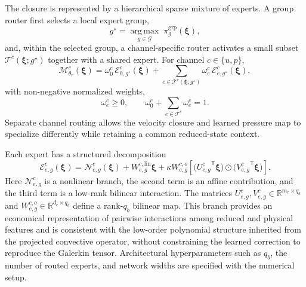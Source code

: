 The closure is represented by a hierarchical sparse mixture of experts.  A
group router first selects a local expert group,
\begin{equation}
  g^{\star}
  =
  \underset{g\in\mathcal{G}}{\operatorname{arg\,max}}
  \;\pi_g^{\mathrm{grp}}(\boldsymbol{\xi}),
  \label{eq:group_top1}
\end{equation}
and, within the selected group, a channel-specific router activates a small
subset $\mathcal{T}^{c}(\boldsymbol{\xi};g^{\star})$ together with a shared
expert.  For channel $c\in\{u,p\}$,
\begin{equation}
  \boldsymbol{\mathcal{M}}^{c}_{\theta_r}(\boldsymbol{\xi})
  =
  \omega^{c}_{0}\,
  \mathcal{E}^{c}_{0,g^{\star}}(\boldsymbol{\xi})
  +
  \sum_{e\in\mathcal{T}^{c}(\boldsymbol{\xi};g^{\star})}
  \omega^{c}_{e}\,
  \mathcal{E}^{c}_{e,g^{\star}}(\boldsymbol{\xi}),
  \label{eq:channel_sparse_moe}
\end{equation}
with non-negative normalized weights,
\begin{equation}
  \omega^{c}_{e}\ge 0,
  \qquad
  \omega^{c}_{0}
  +\sum_{e\in\mathcal{T}^{c}}\omega^{c}_{e}=1.
  \label{eq:channel_sparse_weights}
\end{equation}
Separate channel routing allows the velocity closure and learned pressure map
to specialize differently while retaining a common reduced-state context.

Each expert has a structured decomposition
\begin{equation}
  \mathcal{E}^{c}_{e,g}(\boldsymbol{\xi})
  =
  \mathcal{N}^{c}_{e,g}(\boldsymbol{\xi})
  +W^{c,\mathrm{lin}}_{e,g}\boldsymbol{\xi}
  +\kappa W^{c,o}_{e,g}
  \left[
    \bigl({U^{c}_{e,g}}^{\mathsf T}\boldsymbol{\xi}\bigr)
    \odot
    \bigl({V^{c}_{e,g}}^{\mathsf T}\boldsymbol{\xi}\bigr)
  \right].
  \label{eq:physics_aware_expert}
\end{equation}
Here $\mathcal{N}^{c}_{e,g}$ is a nonlinear branch, the second term is an
affine contribution, and the third term is a low-rank bilinear interaction.
The matrices $U^{c}_{e,g},V^{c}_{e,g}\in\mathbb{R}^{m_r\times q_b}$ and
$W^{c,o}_{e,g}\in\mathbb{R}^{d_c\times q_b}$ define a rank-$q_b$ bilinear
map.  This branch provides an economical representation of pairwise
interactions among reduced and physical features and is consistent with the
low-order polynomial structure inherited from the projected convective
operator, without constraining the learned correction to reproduce the
Galerkin tensor.  Architectural hyperparameters such as $q_b$, the number of
routed experts, and network widths are specified with the numerical setup.


